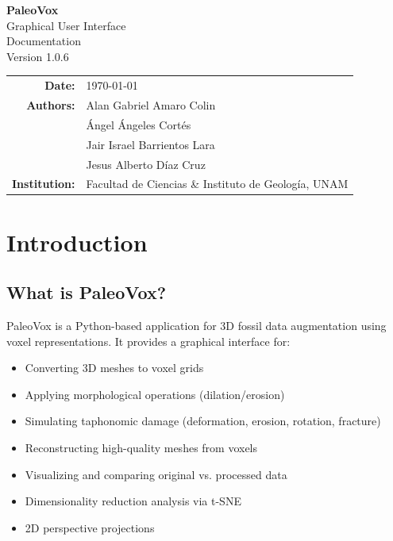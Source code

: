 \documentclass[12pt,a4paper]{article}
\begin{document}
\begin{titlepage}
\centering
\vspace*{3cm}

{\Huge\bfseries PaleoVox}\\[0.5cm]
{\Large Graphical User Interface}\\[0.5cm]
{\Large Documentation}\\[1.5cm]

{\large Version 1.0.6}\\[2cm]

\begin{tabular}{rl}
\textbf{Date:} & \today \\
\textbf{Authors:} & Alan Gabriel Amaro Colin \\
                 & Ángel Ángeles Cortés \\
                 & Jair Israel Barrientos Lara \\
                 & Jesus Alberto Díaz Cruz \\
\textbf{Institution:} & Facultad de Ciencias \& Instituto de Geología, UNAM \\
\end{tabular}

\vfill
\end{titlepage}

\tableofcontents
\newpage

\section{Introduction}

\subsection{What is PaleoVox?}

PaleoVox is a Python-based application for 3D fossil data augmentation using voxel representations. It provides a graphical interface for:

\begin{itemize}
  \item Converting 3D meshes to voxel grids
  \item Applying morphological operations (dilation/erosion)
  \item Simulating taphonomic damage (deformation, erosion, rotation, fracture)
  \item Reconstructing high-quality meshes from voxels
  \item Visualizing and comparing original vs. processed data
  \item Dimensionality reduction analysis via t-SNE
  \item 2D perspective projections
\end{itemize}
\end{document}
